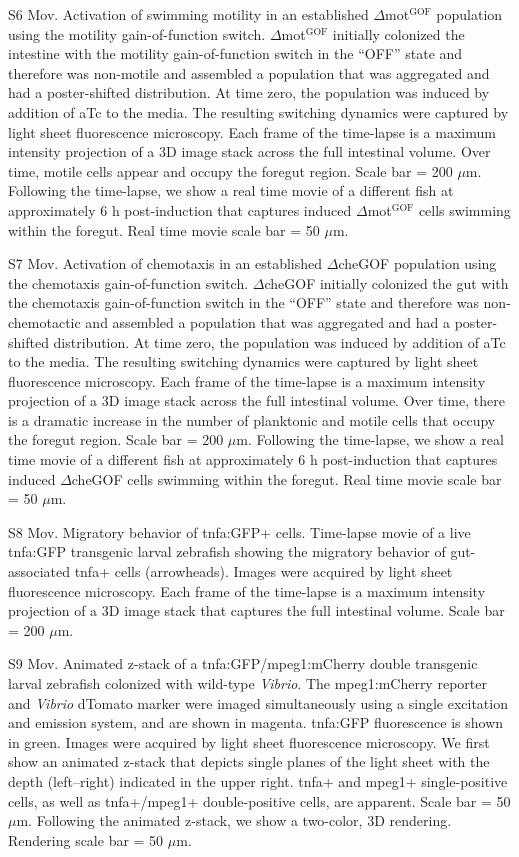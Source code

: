 S6 Mov. Activation of swimming motility in an established $\Delta$mot$^{\text{GOF}}$ population using the motility gain-of-function switch. 
$\Delta$mot$^{\text{GOF}}$ initially colonized the intestine with the motility gain-of-function switch in the ``OFF'' state and therefore was non-motile and assembled a population that was aggregated and had a poster-shifted distribution. At time zero, the population was induced by addition of aTc to the media. The resulting switching dynamics were captured by light sheet fluorescence microscopy. Each frame of the time-lapse is a maximum intensity projection of a 3D image stack across the full intestinal volume. Over time, motile cells appear and occupy the foregut region. Scale bar = 200 $\mu$m. Following the time-lapse, we show a real time movie of a different fish at approximately 6 h post-induction that captures induced $\Delta$mot$^{\text{GOF}}$ cells swimming within the foregut. Real time movie scale bar = 50 $\mu$m.

S7 Mov. Activation of chemotaxis in an established $\Delta$cheGOF population using the chemotaxis gain-of-function switch. 
$\Delta$cheGOF initially colonized the gut with the chemotaxis gain-of-function switch in the ``OFF'' state and therefore was non-chemotactic and assembled a population that was aggregated and had a poster-shifted distribution. At time zero, the population was induced by addition of aTc to the media. The resulting switching dynamics were captured by light sheet fluorescence microscopy. Each frame of the time-lapse is a maximum intensity projection of a 3D image stack across the full intestinal volume. Over time, there is a dramatic increase in the number of planktonic and motile cells that occupy the foregut region. Scale bar = 200 $\mu$m. Following the time-lapse, we show a real time movie of a different fish at approximately 6 h post-induction that captures induced $\Delta$cheGOF cells swimming within the foregut. Real time movie scale bar = 50 $\mu$m.

S8 Mov. Migratory behavior of tnfa:GFP+ cells. 
Time-lapse movie of a live tnfa:GFP transgenic larval zebrafish showing the migratory behavior of gut-associated tnfa+ cells (arrowheads). Images were acquired by light sheet fluorescence microscopy. Each frame of the time-lapse is a maximum intensity projection of a 3D image stack that captures the full intestinal volume. Scale bar = 200 $\mu$m.

S9 Mov. Animated z-stack of a tnfa:GFP/mpeg1:mCherry double transgenic larval zebrafish colonized with wild-type \textit{Vibrio}. 
The mpeg1:mCherry reporter and \textit{Vibrio} dTomato marker were imaged simultaneously using a single excitation and emission system, and are shown in magenta. tnfa:GFP fluorescence is shown in green. Images were acquired by light sheet fluorescence microscopy. We first show an animated z-stack that depicts single planes of the light sheet with the depth (left–right) indicated in the upper right. tnfa+ and mpeg1+ single-positive cells, as well as tnfa+/mpeg1+ double-positive cells, are apparent. Scale bar = 50 $\mu$m. Following the animated z-stack, we show a two-color, 3D rendering. Rendering scale bar = 50 $\mu$m.

